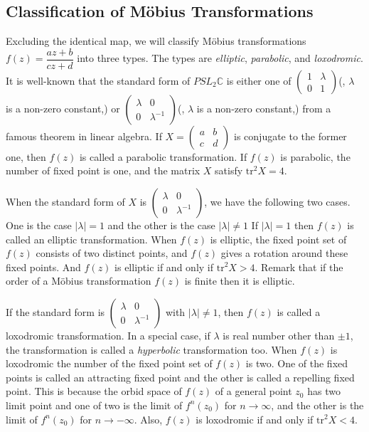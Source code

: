 \subsection{Classification of M\"obius Transformations}

Excluding the identical map, we will classify M\"obius transformations
$f(z) = \dfrac{az + b}{cz + d}$ into three types.
The types are \textit{elliptic}, \textit{parabolic}, and \textit{loxodromic}.
It is well-known that the standard form of $PSL_2\mathbb{C}$
is either one of $\begin{pmatrix}1 & \lambda \\ 0 & 1 \end{pmatrix}$(, $\lambda$ is a non-zero constant,) or
$\begin{pmatrix}\lambda & 0 \\ 0 & \lambda^{-1} \end{pmatrix}$(, $\lambda$ is a non-zero constant,) 
from a famous theorem in linear algebra.
If $X=\begin{pmatrix}a & b \\ c & d \end{pmatrix}$ is conjugate to the former one,
then $f(z)$ is called a parabolic transformation.
If $f(z)$ is parabolic, the number of fixed point is one, and
the matrix $X$ satisfy $\mathrm{tr}^2X = 4$.

When the standard form of $X$ is
$\begin{pmatrix}\lambda & 0 \\ 0 & \lambda^{-1} \end{pmatrix}$,
we have the following two cases. 
One is the case $|\lambda|=1$ and the other is the case $|\lambda|\neq 1$ 
If $|\lambda|=1$ then $f(z)$ is called an elliptic transformation.
When $f(z)$ is elliptic,  the fixed point set of $f(z)$ consists of two distinct points,
and $f(z)$ gives a rotation around these fixed points.
And $f(z)$ is elliptic if and only if $\mathrm{tr}^2X > 4$.
Remark that if the order of a M\"obius transformation $f(z)$ is finite
then it is elliptic.

If the standard form is
$\begin{pmatrix}\lambda & 0 \\ 0 & \lambda^{-1} \end{pmatrix}$
with $|\lambda| \neq 1$, then $f(z)$ is called a loxodromic transformation.
In a special case, if $\lambda$ is real number other than $\pm 1$, the transformation is called
a \textit{hyperbolic} transformation too.
When $f(z)$ is loxodromic the number of the fixed point set of $f(z)$ is two.
One of the fixed points is called an attracting fixed point and the other is called a 
repelling fixed point. This is because the orbid space of $f(z)$ of a
general point $z_0$ has two limit point and one of two is the limit of
$f^n(z_0)$ for $n\to \infty$, and the other is the limit of $f^n(z_0)$
for $n\to -\infty$. 
Also, $f(z)$ is loxodromic if and only if $\mathrm{tr}^2X < 4$.

